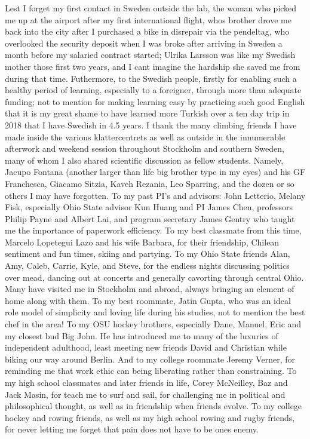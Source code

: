 Lest I forget my first contact in Sweden outside the lab, the woman who picked me up at the airport after my first international flight, whos brother drove me back into the city after I purchased a bike in disrepair via the pendeltag, who overlooked the security deposit when I was broke after arriving in Sweden a month before my salaried contract started; Ulrika Larsson was like my Swedish mother those first two years, and I cant imagine the hardship she saved me from during that time. Futhermore, to the Swedish people, firstly for enabling such a healthy period of learning, especially to a foreigner, through more than adequate funding; not to mention for making learning easy by practicing such good English that it is my great shame to have learned more Turkish over a ten day trip in 2018 that I have Swedish in 4.5 years.
I thank the many climbing friends I have made inside the various klattercentrets as well as outside in the innumerable afterwork and weekend session throughout Stockholm and southern Sweden, many of whom I also shared scientific discussion as fellow students. Namely, Jacupo Fontana (another larger than life big brother type in my eyes) and his GF Franchesca, Giacamo Sitzia, Kaveh Rezania, Leo Sparring, and the dozen or so others I may have forgotten.
To my past PI's and advisors: John Letterio, Melany Fisk, especially Ohio State advisor Kun Huang and PI James Chen, professors Philip Payne and Albert Lai, and program secretary James Gentry who taught me the importance of paperwork efficiency. To my best classmate from this time, Marcelo Lopetegui Lazo and his wife Barbara, for their friendship, Chilean sentiment and fun times, skiing and partying. To my Ohio State friends Alan, Amy, Caleb, Carrie, Kyle, and Steve, for the endless nights discussing politics over mead, dancing out at concerts and generally cavorting through central Ohio. Many have visited me in Stockholm and abroad, always bringing an element of home along with them. To my best roommate, Jatin Gupta, who was an ideal role model of simplicity and loving life during his studies, not to mention the best chef in the area! To my OSU hockey brothers, especially Dane, Manuel, Eric and my closest bud Big John. He has introduced me to many of the luxuries of independent adulthood, least meeting new friends David and Christian while biking our way around Berlin. And to my college roommate Jeremy Verner, for reminding me that work ethic can being liberating rather than constraining. To my high school classmates and later friends in life, Corey McNeilley, Baz and Jack Masin, for teach me to surf and sail, for challenging me in political and philosophical thought, as well as in friendship when friends evolve. To my college hockey and rowing friends, as well as my high school rowing and rugby friends, for never letting me forget that pain does not have to be ones enemy.
